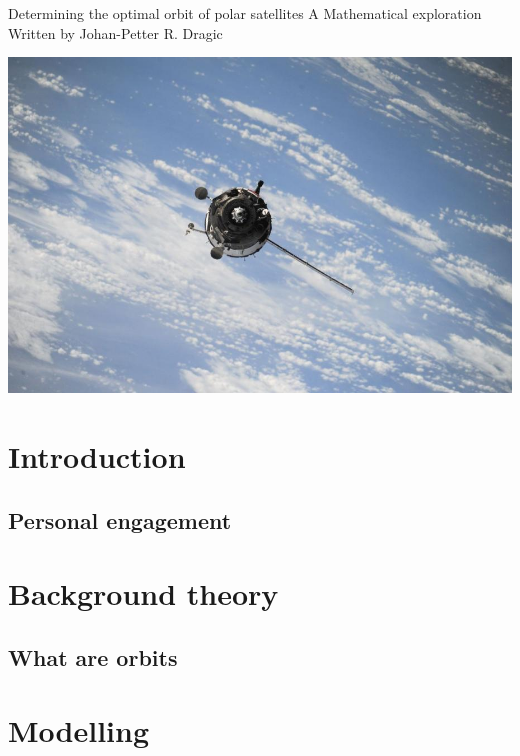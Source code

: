 \documentclass[12pt]{article}
\begin{document}
    \begin{titlepage}
        \begin{center}
            {\LARGE Determining the optimal orbit of polar satellites}
            \break
            {\large A Mathematical exploration}
            \break
            \small{Written by Johan-Petter R. Dragic}
            {\date{06.11.2018}}
            

            \vspace{20mm}
            \includegraphics[scale=0.4]{pic1.jpg}
            

        \end{center}
    \end{titlepage}

    \tableofcontents
    \thispagestyle{empty}
    \newpage
    

    \addtocounter{page}{-1}
    \section{Introduction} %
        \subsection{Personal engagement}



    \section{Background theory}
        \subsection{What are orbits}
    \section{Modelling}

    
\end{document}
